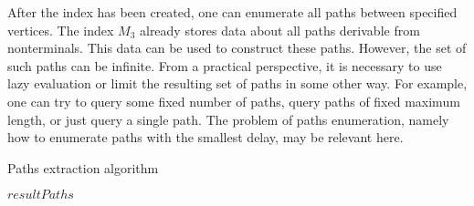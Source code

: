 After the index has been created, one can enumerate all paths between specified vertices.
The index $M_3$ already stores data about all paths derivable from nonterminals.
This data can be used to construct these paths. However, the set of such paths can be infinite.
From a practical perspective, it is necessary to use lazy evaluation or limit the resulting set of paths in some other way.
For example, one can try to query some fixed number of paths, query paths of fixed maximum length, or just query a single path.
The problem of paths enumeration, namely how to enumerate paths with the smallest delay, may be relevant here.

\begin{algorithm}[h]
	\begin{algorithmic}[1]
		\footnotesize
		\caption{Paths extraction algorithm}
		\label{tensor:pathsExtraction}


		\EndFor
		\EndFor

		\State \Return $resultPaths$
		\EndFunction


\end{algorithmic}
\end{algorithm}
